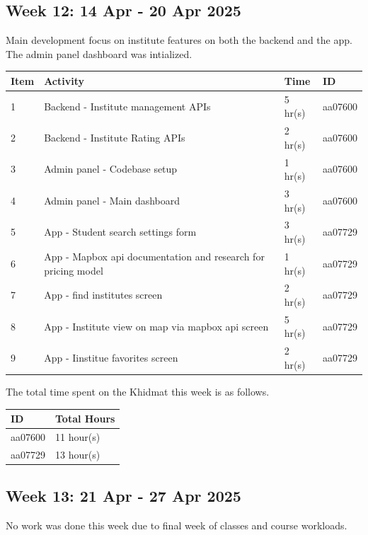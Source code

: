 \documentclass[12pt,a4paper]{article}
\begin{document}
\newpage

\subsection{Week 12: 14 Apr - 20 Apr 2025}
Main development focus on institute features on both the backend and the app. The admin panel dashboard was intialized.

\begin{center}
    \bigskip
    \begin{tabular}{|l|l|l|l|}
        \hline
        Item 	& Activity & Time & ID \\\hline\hline
        1	& Backend - Institute management APIs & 5 hr(s) & aa07600 \\\hline
        2	& Backend - Institute Rating APIs & 2 hr(s) & aa07600 \\\hline
        3	& Admin panel - Codebase setup & 1 hr(s) & aa07600 \\\hline
        4	& Admin panel - Main dashboard & 3 hr(s) & aa07600 \\\hline\hline
        5	& App - Student search settings form & 3 hr(s) & aa07729 \\\hline
        6	& App - Mapbox api documentation and research for pricing model & 1 hr(s) & aa07729 \\\hline
        7	& App - find institutes screen & 2 hr(s) & aa07729 \\\hline
        8	& App - Institute view on map via mapbox api screen & 5 hr(s) & aa07729 \\\hline
        9	& App - Iinstitue favorites screen & 2 hr(s) & aa07729 \\\hline
    \end{tabular}

    \bigskip
    The total time spent on the Khidmat this week is as follows.

    \bigskip
    \begin{tabular}{|l|l|}
        \hline
        ID & Total Hours\\\hline\hline
        aa07600 & 11 hour(s)\\\hline
        aa07729 & 13 hour(s)\\\hline
    \end{tabular}
\end{center}

\newpage

\subsection{Week 13: 21 Apr - 27 Apr 2025}
No work was done this week due to final week of classes and course workloads.
\end{document}
